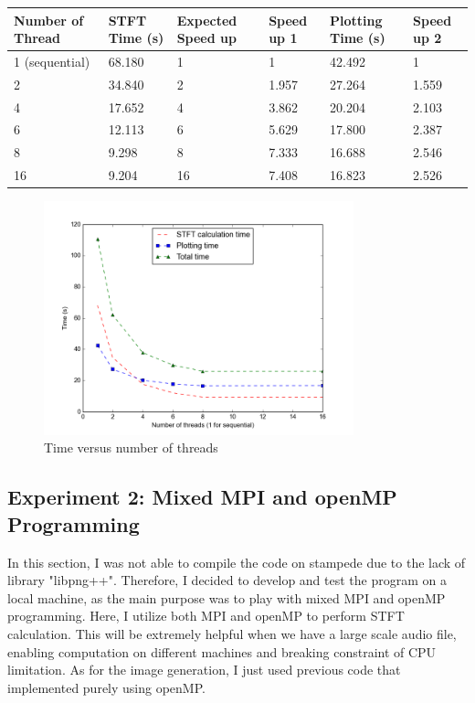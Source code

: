 \documentclass[11pt,letter]{article}
\begin{document}
\begin{center}
  \begin{tabular}{ | l | l | l | l|  l | l |}
    \hline
    Number of Thread & STFT Time (s) & Expected Speed up & Speed up 1 & Plotting Time (s) & Speed up 2\\ \hline
    1 (sequential) & 68.180 & 1& 1 & 42.492 & 1 \\ \hline
    2 & 34.840 & 2& 1.957 & 27.264 & 1.559 \\ \hline
    4 & 17.652 & 4& 3.862 & 20.204 & 2.103 \\ \hline
    6 & 12.113 & 6& 5.629 & 17.800 & 2.387\\ \hline
    8 & 9.298 & 8& 7.333 & 16.688 & 2.546\\ \hline
    16 & 9.204 & 16& 7.408 & 16.823 & 2.526 \\ \hline
  \end{tabular}
\end{center}

\begin{figure}[H]
\centering
\includegraphics[width = 0.8\textwidth]{fig/local_omp.png}
\caption{Time versus number of threads}
\label{fig:local_omp}
\end{figure}

\subsection{Experiment 2: Mixed MPI and openMP Programming}
In this section, I was not able to compile the code on stampede due to the lack of library "libpng++". Therefore, I decided to develop and test the program on a local machine, as the main purpose was to play with mixed MPI and openMP programming. Here, I utilize both MPI and openMP to perform STFT calculation. This will be extremely helpful when we have a large scale audio file, enabling computation on different machines and breaking constraint of CPU limitation. As for the image generation, I just used previous code that implemented purely using openMP.
\end{document}
